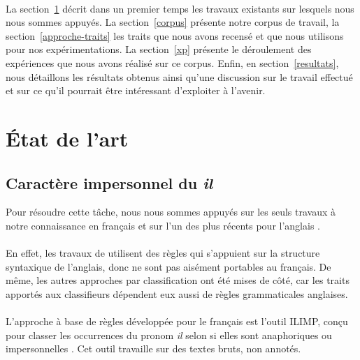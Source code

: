 \documentclass[a4paper,12pt]{article}
\begin{document}
\paragraph{}
La section~\ref{etat-art} décrit dans un premier temps les travaux existants sur lesquels nous nous sommes appuyés. La section~\ref{corpus} présente notre corpus de travail, la section~\ref{approche-traits} les traits que nous avons recensé et que nous utilisons pour nos expérimentations.
La section~\ref{xp} présente le déroulement des expériences que nous avons réalisé sur ce corpus.
Enfin, en section~\ref{resultats}, nous détaillons les résultats obtenus ainsi qu'une discussion sur le travail effectué et sur ce qu'il pourrait être intéressant d'exploiter à l'avenir.

\color{black}

\section{État de l'art}
\label{etat-art}

\subsection{Caractère impersonnel du \og \textit{il} \fg{}}

\color{gray}

Pour résoudre cette tâche, nous nous sommes appuyés sur les seuls travaux à notre connaissance en français \citep{danlos-ilimp-taln2005} et sur l'un des plus récents pour l'anglais \citep{Bergsma-11}.

\paragraph{}
En effet, les travaux de \citet{Lappin-1994-APA-203987.203989} utilisent des règles qui s'appuient sur la structure syntaxique de l'anglais, donc ne sont pas aisément portables au français. De même, les autres approches par classification ont été mises de côté, car les traits apportés aux classifieurs dépendent eux aussi de règles grammaticales anglaises.

\paragraph{}
L'approche à base de règles développée pour le français est l'outil ILIMP, conçu pour classer les occurrences du pronom \og{}\textit{il}\fg{} selon si elles sont anaphoriques ou impersonnelles \citep{danlos-ilimp-taln2005}. Cet outil travaille sur des textes bruts, non annotés.
\end{document}

